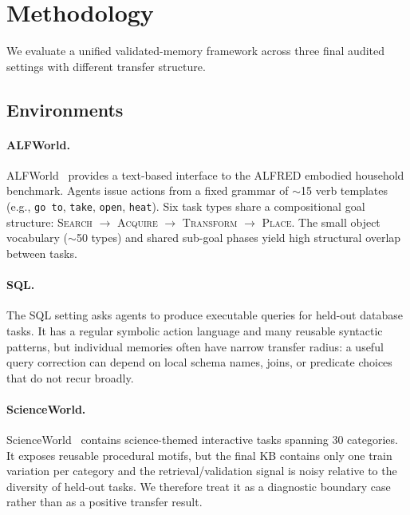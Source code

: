 \section{Methodology}
\label{sec:methodology}

We evaluate a unified validated-memory framework across three final audited settings with different transfer structure.

\subsection{Environments}
\label{sec:environments}

\paragraph{ALFWorld.}
ALFWorld~\cite{shridhar2021alfworld} provides a text-based interface to the ALFRED embodied household benchmark. Agents issue actions from a fixed grammar of ${\sim}$15 verb templates (e.g., \texttt{go to}, \texttt{take}, \texttt{open}, \texttt{heat}). Six task types share a compositional goal structure: \textsc{Search} $\rightarrow$ \textsc{Acquire} $\rightarrow$ \textsc{Transform} $\rightarrow$ \textsc{Place}. The small object vocabulary (${\sim}$50 types) and shared sub-goal phases yield high structural overlap between tasks.

\paragraph{SQL.}
The SQL setting asks agents to produce executable queries for held-out database tasks.
It has a regular symbolic action language and many reusable syntactic patterns, but individual memories often have narrow transfer radius: a useful query correction can depend on local schema names, joins, or predicate choices that do not recur broadly.

\paragraph{ScienceWorld.}
ScienceWorld~\cite{wang2022scienceworld} contains science-themed interactive tasks spanning 30 categories.
It exposes reusable procedural motifs, but the final KB contains only one train variation per category and the retrieval/validation signal is noisy relative to the diversity of held-out tasks.
We therefore treat it as a diagnostic boundary case rather than as a positive transfer result.

